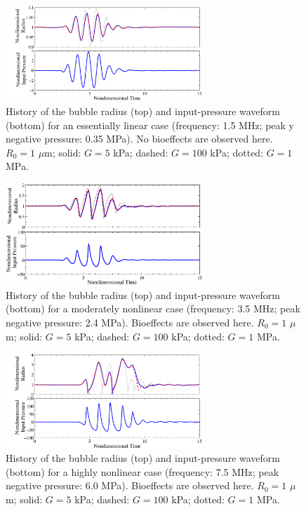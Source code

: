
\begin{figure}
  \centering \includegraphics[width=0.66\textwidth]{./figs/bubble_figs/rt_linear}
  \caption{History of the bubble radius (top) and input-pressure
    waveform (bottom) for an essentially linear case (frequency: 1.5 MHz; peak y
    negative pressure: 0.35 MPa). No bioeffects are observed
    here. $R_0=1$ $\mu$m; solid: $G=5$ kPa; dashed: $G=100$ kPa; dotted: $G=1$ MPa.}
  \label{figure:sample_bubble_linear}
\end{figure}

\begin{figure}
  \centering \includegraphics[width=0.66\textwidth]{./figs/bubble_figs/rt_intermediate}%
  \caption{History of the bubble radius (top) and input-pressure
    waveform (bottom) for a moderately nonlinear case (frequency: 3.5 MHz; peak 
    negative pressure: 2.4 MPa). Bioeffects are
    observed here. $R_0=1$ $\mu$m; solid: $G=5$ kPa; dashed: $G=100$ kPa;
    dotted: $G=1$ MPa.}
  \label{figure:sample_bubble_intermediate}
\end{figure}

\begin{figure}
  \centering \includegraphics[width=0.66\textwidth]{./figs/bubble_figs/rt_nonlinear}
  \caption{History of the bubble radius (top) and input-pressure
    waveform (bottom) for a highly nonlinear case (frequency: 
    7.5 MHz; peak negative pressure: 6.0 MPa). Bioeffects are observed
    here. $R_0=1$ $\mu$m; solid: $G=5$ kPa; dashed: $G=100$ kPa; dotted: $G=1$ MPa.}
  \label{figure:sample_bubble_nonlinear}
\end{figure}

